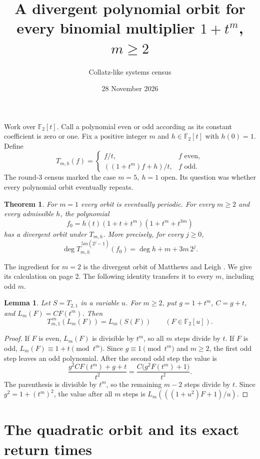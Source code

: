 \documentclass[11pt,a4paper]{article}
\title{A divergent polynomial orbit for every binomial multiplier \(1+t^m\), \(m\ge2\)}
\author{Collatz-like systems census}
\date{28 November 2026}
\newtheorem{theorem}{Theorem}
\newtheorem{lemma}{Lemma}
\newcommand{\F}{\mathbb F_2}
\newcommand{\Tm}{T_{m,1}}
\begin{document}
\maketitle

Work over \(\F[t]\). Call a polynomial even or odd according as its constant coefficient is zero or one. Fix a positive integer \(m\) and \(h\in\F[t]\) with \(h(0)=1\). Define
\[
 T_{m,h}(f)=
 \begin{cases}
 f/t,& f\text{ even},\\
 ((1+t^m)f+h)/t,& f\text{ odd}.
 \end{cases}
\]
The round-3 census marked the case \(m=5,\ h=1\) open. Its question was whether every polynomial orbit eventually repeats.

\begin{theorem}
For \(m=1\) every orbit is eventually periodic. For every \(m\ge2\) and every admissible \(h\), the polynomial
\[
 f_0=h(t)(1+t+t^m)(1+t^m+t^{3m})
\]
has a divergent orbit under \(T_{m,h}\). More precisely, for every \(j\ge0\),
\[
 \deg T_{m,h}^{\,5m(2^j-1)}(f_0)=\deg h + m+3m\,2^j .
\]
\end{theorem}

The ingredient for \(m=2\) is the divergent orbit of Matthews and Leigh \cite{ml}. We give its calculation on page 2. The following identity transfers it to every \(m\), including odd \(m\).

\begin{lemma}
Let \(S=T_{2,1}\) in a variable \(u\). For \(m\ge2\), put \(g=1+t^m\), \(C=g+t\), and \(L_m(F)=C F(t^m)\). Then
\[
    \Tm^{\,m}(L_m(F)) = L_m(S(F))\qquad(F\in\F[u]).
\]
\end{lemma}
\begin{proof}
If \(F\) is even, \(L_m(F)\) is divisible by \(t^m\), so all \(m\) steps divide by \(t\).
If \(F\) is odd, \(L_m(F)\equiv1+t\pmod {t^m}\).
Since \(g\equiv1\pmod {t^m}\) and \(m\ge2\), the first odd step leaves an odd polynomial. After the second odd step the value is
\[
 \frac{g^2 C F(t^m)+g+t}{t^2}
 =\frac{C\bigl(g^2 F(t^m)+1\bigr)}{t^2}.
\]
The parenthesis is divisible by \(t^m\), so the remaining \(m-2\) steps divide by \(t\). Since \(g^2=1+(t^m)^2\), the value after all \(m\) steps is \(L_m(((1+u^2)F+1)/u)\).
\end{proof}

\newpage
\section*{The quadratic orbit and its exact return times}
\end{document}

